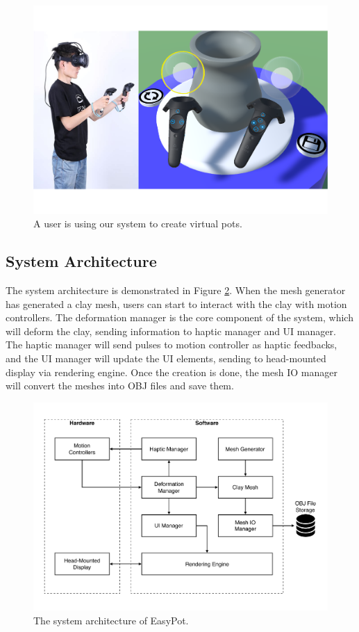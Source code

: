 \documentclass{svjour3}                     %
\begin{document}
\begin{figure}
\includegraphics[width=\textwidth]{results}
\caption{A user is using our system to create virtual pots.}
\label{fig:results}
\end{figure}

\subsection{System Architecture}
\label{sec:3.1}

The system architecture is demonstrated in Figure \ref{fig:arc}. When the mesh generator has generated a clay mesh, users can start to interact with the clay with motion controllers. The deformation manager is the core component of the system, which will deform the clay, sending information to haptic manager and UI manager. The haptic manager will send pulses to motion controller as haptic feedbacks, and the UI manager will update the UI elements, sending to head-mounted display via rendering engine. Once the creation is done, the mesh IO manager will convert the meshes into OBJ files and save them.

\begin{figure}
\includegraphics[width=\textwidth]{arc.pdf}
\caption{The system architecture of EasyPot.}
\label{fig:arc}
\end{figure}
\end{document}

